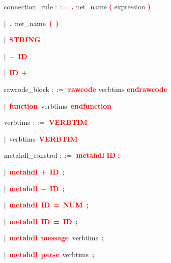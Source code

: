 \vspace{1em}
\noindent
\settowidth{\parindent}{\hspace{4ex}}
connection\_rule $::=$\hspace{1ex} \textbf{\textcolor{red}{.}} net\_name \textbf{\textcolor{red}{(}} expression \textbf{\textcolor{red}{)}}

\mbox{$|$ \textbf{\textcolor{red}{.}} net\_name \textbf{\textcolor{red}{(}} \textbf{\textcolor{red}{)}}}

\mbox{$|$ \textbf{\textcolor{red}{STRING}}}

\mbox{$|$ \textbf{\textcolor{red}{$+$}} \textbf{\textcolor{red}{ID}}}

\mbox{$|$ \textbf{\textcolor{red}{ID}} \textbf{\textcolor{red}{$+$}}}

\vspace{1em}
\noindent
\settowidth{\parindent}{\hspace{4ex}}
rawcode\_block $::=$\hspace{1ex} \textbf{\textcolor{red}{rawcode}} verbtims \textbf{\textcolor{red}{endrawcode}}

\mbox{$|$ \textbf{\textcolor{red}{function}} verbtims \textbf{\textcolor{red}{endfunction}}}

\vspace{1em}
\noindent
\settowidth{\parindent}{\hspace{4ex}}
verbtims $::=$\hspace{1ex} \textbf{\textcolor{red}{VERBTIM}}

\mbox{$|$ verbtims \textbf{\textcolor{red}{VERBTIM}}}

\vspace{1em}
\noindent
\settowidth{\parindent}{\hspace{4ex}}
metahdl\_constrol $::=$\hspace{1ex} \textbf{\textcolor{red}{metahdl}} \textbf{\textcolor{red}{ID}} \textbf{\textcolor{red}{;}}

\mbox{$|$ \textbf{\textcolor{red}{metahdl}} \textbf{\textcolor{red}{$+$}} \textbf{\textcolor{red}{ID}} \textbf{\textcolor{red}{;}}}

\mbox{$|$ \textbf{\textcolor{red}{metahdl}} \textbf{\textcolor{red}{$-$}} \textbf{\textcolor{red}{ID}} \textbf{\textcolor{red}{;}}}

\mbox{$|$ \textbf{\textcolor{red}{metahdl}} \textbf{\textcolor{red}{ID}} \textbf{\textcolor{red}{=}} \textbf{\textcolor{red}{NUM}} \textbf{\textcolor{red}{;}}}

\mbox{$|$ \textbf{\textcolor{red}{metahdl}} \textbf{\textcolor{red}{ID}} \textbf{\textcolor{red}{=}} \textbf{\textcolor{red}{ID}} \textbf{\textcolor{red}{;}}}

\mbox{$|$ \textbf{\textcolor{red}{metahdl}} \textbf{\textcolor{red}{message}} verbtims \textbf{\textcolor{red}{;}}}

\mbox{$|$ \textbf{\textcolor{red}{metahdl}} \textbf{\textcolor{red}{parse}} verbtims \textbf{\textcolor{red}{;}}}
